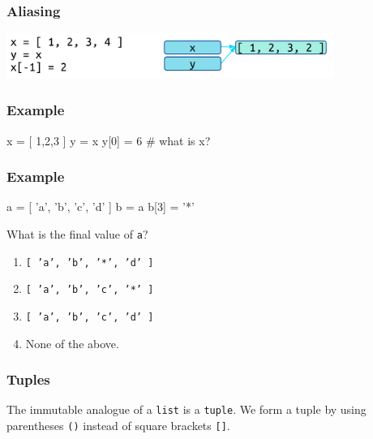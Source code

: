 \documentclass[11pt]{beamer}
\begin{document}
\begin{frame}[fragile]
  \frametitle{Aliasing}
  \Enlarge

  \includegraphics[width=0.8\textwidth]{./img/memory-aliasing.png}
\end{frame}

\begin{frame}[fragile]
  \frametitle{Example}
  \Enlarge

  \begin{semiverbatim}
x = [ 1,2,3 ]
y = x
y[0] = 6
# what is x?
  \end{semiverbatim}
\end{frame}

\begin{frame}[fragile]
  \frametitle{Example}
  \Enlarge

  \begin{semiverbatim}
a = [ 'a', 'b', 'c', 'd' ]
b = a
b[3] = '*'
  \end{semiverbatim}
  What is the final value of \texttt{a}?
  \begin{enumerate}[label=\Alph*]
  \item  \texttt{[ 'a', 'b', '*', 'd' ]}
  \item  \texttt{[ 'a', 'b', 'c', '*' ]}  %
  \item  \texttt{[ 'a', 'b', 'c', 'd' ]}
  \item  None of the above.
  \end{enumerate}
\end{frame}

\begin{frame}[fragile]
  \frametitle{Tuples}
  \Enlarge

  \begin{itemize}
  \myitem  The immutable analogue of a \texttt{list} is a \texttt{tuple}. %
  \myitem  We form a tuple by using parentheses \texttt{()} instead of square brackets \texttt{[]}.
  \end{itemize}
\end{frame}
\end{document}
